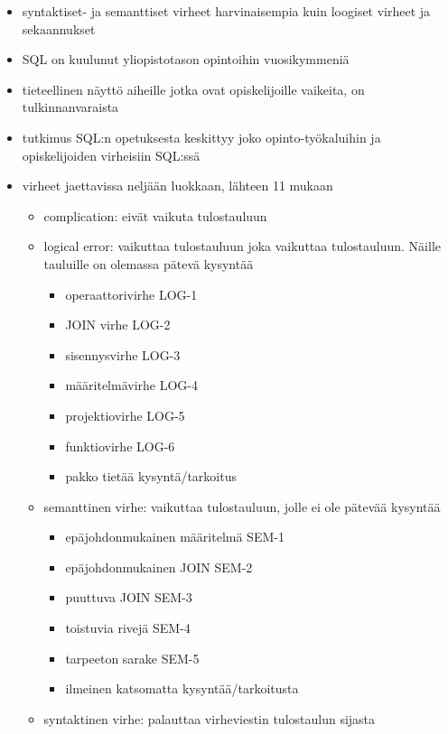 \documentclass[finnish,twoside,openright]{HYgraduMLDS}
\begin{document}
\begin{itemize}
    \item syntaktiset- ja semanttiset virheet harvinaisempia kuin loogiset virheet ja sekaannukset
    \item SQL on kuulunut yliopistotason opintoihin vuosikymmeniä
    \item tieteellinen näyttö aiheille jotka ovat opiskelijoille vaikeita, on tulkinnanvaraista
    \item tutkimus SQL:n opetuksesta keskittyy joko opinto-työkaluihin ja opiskelijoiden virheisiin SQL:ssä
    \item virheet jaettavissa neljään luokkaan, lähteen 11 mukaan
    \begin{itemize}
        \item complication: eivät vaikuta tulostauluun
        \item logical error: vaikuttaa tulostauluun joka vaikuttaa tulostauluun. Näille tauluille on olemassa pätevä kysyntää
        \begin{itemize}
            \item operaattorivirhe LOG-1
            \item JOIN virhe LOG-2
            \item sisennysvirhe LOG-3
            \item määritelmävirhe LOG-4
            \item projektiovirhe LOG-5
            \item funktiovirhe LOG-6
            \item pakko tietää kysyntä/tarkoitus
        \end{itemize}
        \item semanttinen virhe: vaikuttaa tulostauluun, jolle ei ole pätevää kysyntää
        \begin{itemize}
            \item epäjohdonmukainen määritelmä SEM-1
            \item epäjohdonmukainen JOIN SEM-2
            \item puuttuva JOIN SEM-3
            \item toistuvia rivejä SEM-4
            \item tarpeeton sarake SEM-5
            \item ilmeinen katsomatta kysyntää/tarkoitusta
        \end{itemize}
        \item syntaktinen virhe: palauttaa virheviestin tulostaulun sijasta
        \begin{itemize}

\end{itemize}
\end{itemize}
\end{itemize}
\end{document}
